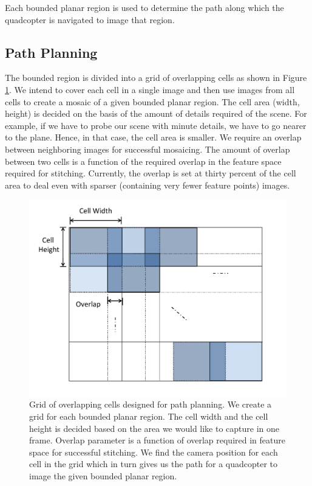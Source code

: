 Each bounded planar region is used to determine the path along which
the quadcopter is navigated to image that region.

\subsection{Path Planning}
The bounded region is divided into a grid of overlapping cells as shown in
Figure \ref{fig:grid}. We intend to cover each cell in a single image and then
use images from all cells to create a mosaic of a given bounded planar
region. The cell area (width, height) is decided on the basis of the amount of
details required of the scene. For example, if we have to probe our scene with
minute details, we have to go nearer to the plane. Hence, in that case, the
cell area is smaller. We require an overlap between neighboring images for
successful mosaicing. The amount of overlap between two cells is a function of
the required overlap in the feature space required for stitching. Currently,
the overlap is set at thirty percent of the cell area to deal even with sparser
(containing very fewer feature points) images.

\begin{figure}[h!]
\centering
\includegraphics[width=\linewidth]{figures/multiplanar/PathPlanningGrid}
\caption[Creation of Grid for Path planning]{Grid of overlapping cells designed
for path planning. We create a grid for each bounded planar region. The cell width and the cell height is
decided based on the area we would like to capture in one frame. Overlap parameter is
a function of overlap required in feature space for successful stitching.
We find the camera position for each cell in the grid which in turn
gives us the path for a quadcopter to image the given bounded planar region.}
\label{fig:grid}
\end{figure}

